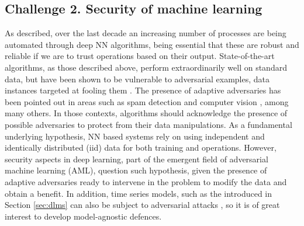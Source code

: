 


\subsection{Challenge 2. Security of machine learning}


As described, over the last decade
an increasing number of processes are being automated through 
deep NN algorithms, being 
essential that these are robust and reliable
if we are to
trust operations based on their output. State-of-the-art
algorithms, as those described above, perform extraordinarily well on standard data,  but have been
shown to be vulnerable to adversarial examples, data instances targeted at
fooling them \parencite{goodfellow2014explaining}.
The presence of adaptive adversaries has
been pointed out in areas such as spam detection \parencite{zeager2017adversarial}
and computer vision \parencite{goodfellow2014explaining}, among many others. 
In those contexts, algorithms should acknowledge the presence of possible adversaries
to protect from their data manipulations.
As a fundamental underlying hypothesis, NN
based systems rely on using 
independent and identically distributed (iid) data for both training and operations. However, security aspects in deep
learning, part of the emergent field of
adversarial machine learning (AML),
question such hypothesis, given the
presence of adaptive adversaries ready to  intervene in the problem 
to modify the data and obtain a benefit. In addition, time series models, such as the introduced in Section \ref{sec:dlms} can also be subject to adversarial attacks \parencite{9063523,10.5555/3016100.3016102}, so it is of great interest to develop model-agnostic defences.

